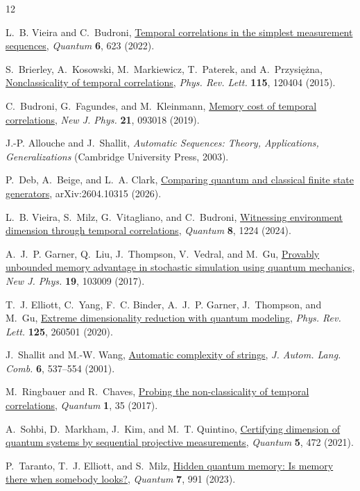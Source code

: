 \documentclass[a4paper,twocolumn,11pt,unpublished]{quantumarticle}
\begin{document}
\begingroup
\small
\begin{thebibliography}{12}

L.~B. Vieira and C.~Budroni,
\href{https://doi.org/10.22331/q-2022-01-18-623}
{Temporal correlations in the simplest measurement sequences},
\textit{Quantum} \textbf{6}, 623 (2022).

S.~Brierley, A.~Kosowski, M.~Markiewicz, T.~Paterek, and
A.~Przysi\k{e}\.{z}na,
\href{https://doi.org/10.1103/PhysRevLett.115.120404}
{Nonclassicality of temporal correlations},
\textit{Phys. Rev. Lett.} \textbf{115}, 120404 (2015).

C.~Budroni, G.~Fagundes, and M.~Kleinmann,
\href{https://doi.org/10.1088/1367-2630/ab3cb4}
{Memory cost of temporal correlations},
\textit{New J. Phys.} \textbf{21}, 093018 (2019).

J.-P. Allouche and J.~Shallit,
\textit{Automatic Sequences: Theory, Applications, Generalizations}
(Cambridge University Press, 2003).

P.~Deb, A.~Beige, and L.~A. Clark,
\href{https://arxiv.org/abs/2604.10315}
{Comparing quantum and classical finite state generators},
arXiv:2604.10315 (2026).

L.~B. Vieira, S.~Milz, G.~Vitagliano, and C.~Budroni,
\href{https://doi.org/10.22331/q-2024-01-10-1224}
{Witnessing environment dimension through temporal correlations},
\textit{Quantum} \textbf{8}, 1224 (2024).

A.~J.~P. Garner, Q.~Liu, J.~Thompson, V.~Vedral, and M.~Gu,
\href{https://doi.org/10.1088/1367-2630/aa82df}
{Provably unbounded memory advantage in stochastic simulation using quantum
mechanics},
\textit{New J. Phys.} \textbf{19}, 103009 (2017).

T.~J. Elliott, C.~Yang, F.~C. Binder, A.~J.~P. Garner, J.~Thompson, and M.~Gu,
\href{https://doi.org/10.1103/PhysRevLett.125.260501}
{Extreme dimensionality reduction with quantum modeling},
\textit{Phys. Rev. Lett.} \textbf{125}, 260501 (2020).

J.~Shallit and M.-W. Wang,
\href{https://doi.org/10.25596/jalc-2001-537}
{Automatic complexity of strings},
\textit{J. Autom. Lang. Comb.} \textbf{6}, 537--554 (2001).

M.~Ringbauer and R.~Chaves,
\href{https://doi.org/10.22331/q-2017-11-25-35}
{Probing the non-classicality of temporal correlations},
\textit{Quantum} \textbf{1}, 35 (2017).

A.~Sohbi, D.~Markham, J.~Kim, and M.~T. Quintino,
\href{https://doi.org/10.22331/q-2021-06-10-472}
{Certifying dimension of quantum systems by sequential projective
measurements},
\textit{Quantum} \textbf{5}, 472 (2021).

P.~Taranto, T.~J. Elliott, and S.~Milz,
\href{https://doi.org/10.22331/q-2023-04-27-991}
{Hidden quantum memory: Is memory there when somebody looks?},
\textit{Quantum} \textbf{7}, 991 (2023).

\end{thebibliography}
\endgroup
\end{document}
